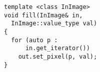 \documentclass[varwidth=4cm,border={0.1cm 0.1cm 0.1cm 0.1cm}]{standalone}
\begin{document}
\begin{verbatim}
template <class InImage>
void fill(InImage& in,
  InImage::value_type val)
{
  for (auto p :
      in.get_iterator())
    out.set_pixel(p, val);
}
\end{verbatim}
\end{document}
